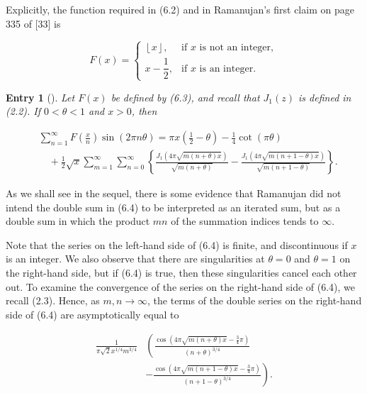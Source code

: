 \documentclass[10pt]{article}
\newcommand{\floor}[1]{\left\lfloor #1\right\rfloor}
\theoremstyle{plain}
\newtheorem{entry}[theorem]{Entry}
\begin{document}
Explicitly, the function required in (6.2) and in Ramanujan's first claim on page 335 of [33] is

\begin{equation*}
F(x)=
\begin{cases}
\floor{x}, & \text{if $x$ is not an integer},\\
x-\dfrac{1}{2}, & \text{if $x$ is an integer}.
\end{cases}
\tag{6.3}
\end{equation*}

\begin{entry}[{\normalfont [33, p.~335]}]
Let $F(x)$ be defined by (6.3), and recall that $J_{1}(z)$ is defined in (2.2). If $0<\theta<1$ and $x>0$, then


\begin{align*}
& \sum_{n=1}^{\infty} F\left(\frac{x}{n}\right) \sin (2 \pi n \theta)=\pi x\left(\frac{1}{2}-\theta\right)-\frac{1}{4} \cot (\pi \theta)  \tag{6.4}\\
& \quad+\frac{1}{2} \sqrt{x} \sum_{m=1}^{\infty} \sum_{n=0}^{\infty}\left\{\frac{J_{1}(4 \pi \sqrt{m(n+\theta) x})}{\sqrt{m(n+\theta)}}-\frac{J_{1}(4 \pi \sqrt{m(n+1-\theta) x})}{\sqrt{m(n+1-\theta)}}\right\} .
\end{align*}
\end{entry}

As we shall see in the sequel, there is some evidence that Ramanujan did not intend the double sum in (6.4) to be interpreted as an iterated sum, but as a double sum in which the product $mn$ of the summation indices tends to $\infty$.

Note that the series on the left-hand side of (6.4) is finite, and discontinuous if $x$ is an integer. We also observe that there are singularities at $\theta=0$ and $\theta=1$ on the right-hand side, but if (6.4) is true, then these singularities cancel each other out. To examine the convergence of the series on the right-hand side of (6.4), we recall (2.3). Hence, as $m, n \to \infty$, the terms of the double series on the right-hand side of (6.4) are asymptotically equal to

$$
\begin{aligned}
\frac{1}{\pi \sqrt{2} x^{1 / 4} m^{3 / 4}} & \left(\frac{\cos \left(4 \pi \sqrt{m(n+\theta) x}-\frac{3}{4} \pi\right)}{(n+\theta)^{3 / 4}}\right. \\
& \left.-\frac{\cos \left(4 \pi \sqrt{m(n+1-\theta) x}-\frac{3}{4} \pi\right)}{(n+1-\theta)^{3 / 4}}\right) .
\end{aligned}
$$
\end{document}
